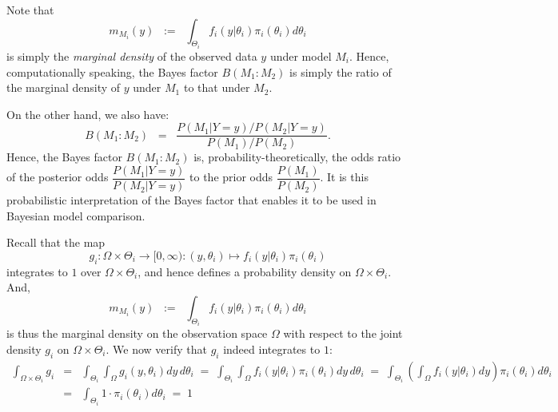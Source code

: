 \begin{remark}\quad
Note that
\begin{equation*}
m_{M_{i}}(y) \;\; := \;\; \int_{\Theta_{i}}f_{i}(y|\theta_{i})\pi_{i}(\theta_{i})d\theta_{i}
\end{equation*}
is simply the \textit{marginal density} of the observed data $y$ under model $M_{i}$.  Hence, computationally speaking, the Bayes factor $B(M_{1}:M_{2})$ is simply the ratio of the marginal density of $y$ under $M_{1}$ to that under $M_{2}$. 
\end{remark}

\begin{remark}\quad
On the other hand, we also have:
\begin{equation*}
B(M_{1}:M_{2}) \;\; = \;\;
\dfrac{P(M_{1}|Y=y)/P(M_{2}|Y=y)}{P(M_{1})/P(M_{2})}.
\end{equation*}
Hence, the Bayes factor $B(M_{1}:M_{2})$ is, probability-theoretically, the odds ratio of the posterior odds $\dfrac{P(M_{1}|Y=y)}{P(M_{2}|Y=y)}$ to the prior odds $\dfrac{P(M_{1})}{P(M_{2})}$.  It is this probabilistic interpretation of the Bayes factor that enables it to be used in Bayesian model comparison.
\end{remark}

\begin{remark}\quad
Recall that the map
\begin{equation*}
g_{i} : \Omega \times \Theta_{i} \longrightarrow [0,\infty) :
(y,\theta_{i}) \longmapsto f_{i}(y|\theta_{i})\pi_{i}(\theta_{i})
\end{equation*}
integrates to $1$ over $\Omega \times \Theta_{i}$, and hence defines a probability density on $\Omega \times \Theta_{i}$.  And,
\begin{equation*}
m_{M_{i}}(y) \;\; := \;\; \int_{\Theta_{i}}f_{i}(y|\theta_{i})\pi_{i}(\theta_{i})d\theta_{i}
\end{equation*}
is thus the marginal density on the observation space $\Omega$ with respect to the joint density $g_{i}$ on $\Omega \times \Theta_{i}$.  We now verify that $g_{i}$ indeed integrates to $1$:
\begin{eqnarray*}
\int_{\Omega\times\Theta_{i}}g_{i}
& = & \int_{\Theta_{i}} \int_{\Omega} g_{i}(y,\theta_{i}) dy\,d\theta_{i}
\; = \; \int_{\Theta_{i}} \int_{\Omega} f_{i}(y|\theta_{i}) \pi_{i}(\theta_{i}) dy\,d\theta_{i}
\; = \; \int_{\Theta_{i}} \left(\int_{\Omega} f_{i}(y|\theta_{i}) dy\right) \pi_{i}(\theta_{i}) d\theta_{i} \\
& = & \int_{\Theta_{i}} 1\cdot\pi_{i}(\theta_{i}) d\theta_{i}
\; = \; 1
\end{eqnarray*}
\end{remark}
